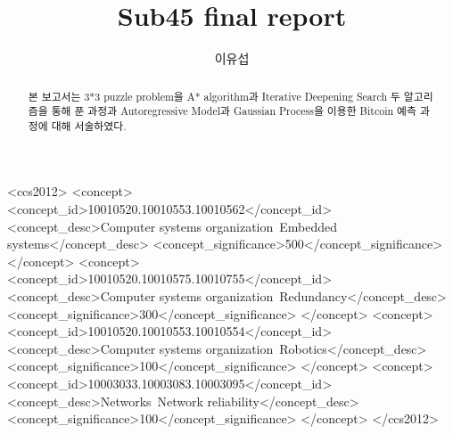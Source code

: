 \documentclass[manuscript,screen,review]{acmart}
\begin{document}
\title{Sub45 final report}

\author{이유섭}
\authornotemark[1]

\renewcommand{\shortauthors}{이유섭}

\begin{abstract}
  본 보고서는 3*3 puzzle problem을 A* algorithm과 Iterative Deepening Search 두 알고리즘을 통해 푼 과정과 Autoregressive Model과 Gaussian Process을 이용한 Bitcoin 예측 과정에 대해 서술하였다.
\end{abstract}

\begin{CCSXML}
<ccs2012>
 <concept>
  <concept_id>10010520.10010553.10010562</concept_id>
  <concept_desc>Computer systems organization~Embedded systems</concept_desc>
  <concept_significance>500</concept_significance>
 </concept>
 <concept>
  <concept_id>10010520.10010575.10010755</concept_id>
  <concept_desc>Computer systems organization~Redundancy</concept_desc>
  <concept_significance>300</concept_significance>
 </concept>
 <concept>
  <concept_id>10010520.10010553.10010554</concept_id>
  <concept_desc>Computer systems organization~Robotics</concept_desc>
  <concept_significance>100</concept_significance>
 </concept>
 <concept>
  <concept_id>10003033.10003083.10003095</concept_id>
  <concept_desc>Networks~Network reliability</concept_desc>
  <concept_significance>100</concept_significance>
 </concept>
</ccs2012>
\end{CCSXML}
\end{document}
